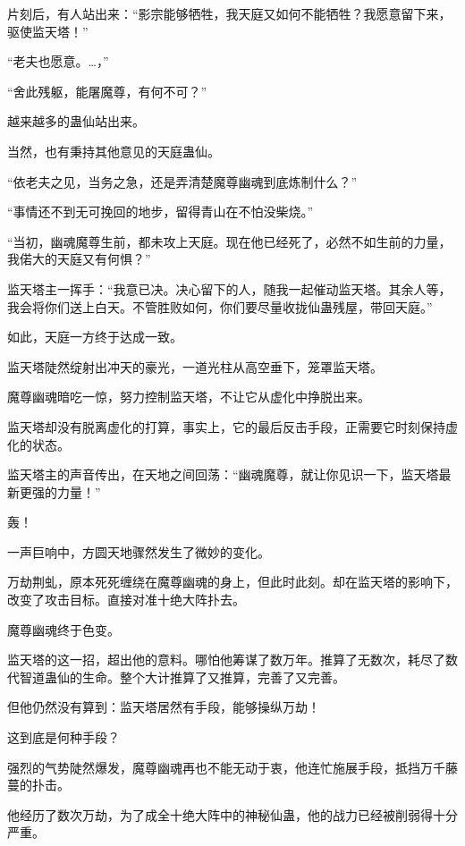 
\begin{this_body}

片刻后，有人站出来：“影宗能够牺牲，我天庭又如何不能牺牲？我愿意留下来，驱使监天塔！”

“老夫也愿意。…，”

“舍此残躯，能屠魔尊，有何不可？”

越来越多的蛊仙站出来。

当然，也有秉持其他意见的天庭蛊仙。

“依老夫之见，当务之急，还是弄清楚魔尊幽魂到底炼制什么？”

“事情还不到无可挽回的地步，留得青山在不怕没柴烧。”

“当初，幽魂魔尊生前，都未攻上天庭。现在他已经死了，必然不如生前的力量，我偌大的天庭又有何惧？”

监天塔主一挥手：“我意已决。决心留下的人，随我一起催动监天塔。其余人等，我会将你们送上白天。不管胜败如何，你们要尽量收拢仙蛊残屋，带回天庭。”

如此，天庭一方终于达成一致。

监天塔陡然绽射出冲天的豪光，一道光柱从高空垂下，笼罩监天塔。

魔尊幽魂暗吃一惊，努力控制监天塔，不让它从虚化中挣脱出来。

监天塔却没有脱离虚化的打算，事实上，它的最后反击手段，正需要它时刻保持虚化的状态。

监天塔主的声音传出，在天地之间回荡：“幽魂魔尊，就让你见识一下，监天塔最新更强的力量！”

轰！

一声巨响中，方圆天地骤然发生了微妙的变化。

万劫荆虬，原本死死缠绕在魔尊幽魂的身上，但此时此刻。却在监天塔的影响下，改变了攻击目标。直接对准十绝大阵扑去。

魔尊幽魂终于色变。

监天塔的这一招，超出他的意料。哪怕他筹谋了数万年。推算了无数次，耗尽了数代智道蛊仙的生命。整个大计推算了又推算，完善了又完善。

但他仍然没有算到：监天塔居然有手段，能够操纵万劫！

这到底是何种手段？

强烈的气势陡然爆发，魔尊幽魂再也不能无动于衷，他连忙施展手段，抵挡万千藤蔓的扑击。

他经历了数次万劫，为了成全十绝大阵中的神秘仙蛊，他的战力已经被削弱得十分严重。


\end{this_body}
